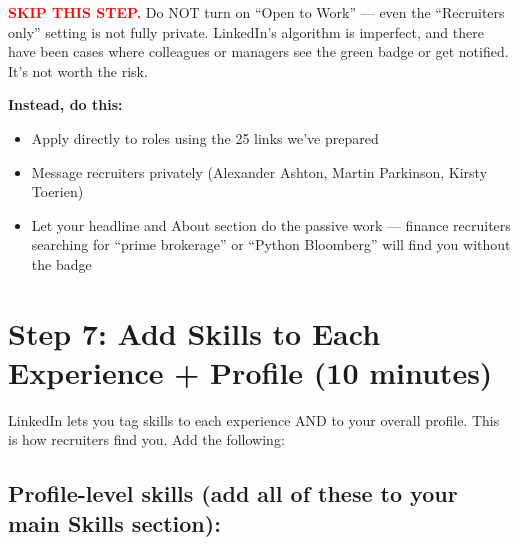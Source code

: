 \documentclass[11pt,a4paper]{article}
\begin{document}
\begin{mdframed}[linecolor=red, linewidth=1pt, innerleftmargin=10pt, innerrightmargin=10pt, innertopmargin=8pt, innerbottommargin=8pt]
\textcolor{red}{\bfseries SKIP THIS STEP.} Do NOT turn on ``Open to Work'' --- even the ``Recruiters only'' setting is not fully private. LinkedIn's algorithm is imperfect, and there have been cases where colleagues or managers see the green badge or get notified. It's not worth the risk.

\vspace{6pt}
\textbf{Instead, do this:}
\begin{itemize}[leftmargin=1.2em]
    \item Apply directly to roles using the 25 links we've prepared
    \item Message recruiters privately (Alexander Ashton, Martin Parkinson, Kirsty Toerien)
    \item Let your headline and About section do the passive work --- finance recruiters searching for ``prime brokerage'' or ``Python Bloomberg'' will find you without the badge
\end{itemize}
\end{mdframed}

\section{Step 7: Add Skills to Each Experience + Profile (10 minutes)}

LinkedIn lets you tag skills to each experience AND to your overall profile. This is how recruiters find you. Add the following:

\subsection{Profile-level skills (add all of these to your main Skills section):}
\end{document}
